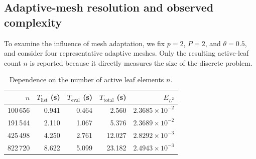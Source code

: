 \documentclass[a4paper,10pt]{article}
\begin{document}
\subsection{Adaptive-mesh resolution and observed complexity}

To examine the influence of mesh adaptation, we fix \(p=2\), \(P=2\), and
\(\theta=0.5\), and consider four representative adaptive meshes.  Only
the resulting active-leaf count \(n\) is reported because it directly
measures the size of the discrete problem.

\begin{table}[H]
\centering
\caption{Dependence on the number of active leaf elements \(n\).}
\label{tab:experiment_n_compact}
\begin{tabular}{rrrrr}
\toprule
\(n\) & \(T_{\mathrm{list}}\) (s) &
\(T_{\mathrm{eval}}\) (s) & \(T_{\mathrm{total}}\) (s) & \(E_{L^2}\)\\
\midrule
100\,656 & 0.941 & 0.464 & 2.560  & \(2.3685\times10^{-2}\)\\
191\,544 & 2.110 & 1.067 & 5.376  & \(2.3689\times10^{-2}\)\\
425\,498 & 4.250 & 2.761 & 12.027 & \(2.8292\times10^{-3}\)\\
822\,720 & 8.622 & 5.099 & 23.182 & \(2.4943\times10^{-3}\)\\
\bottomrule
\end{tabular}
\end{table}
\end{document}
